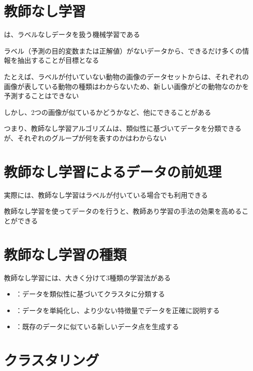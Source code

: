 \documentclass[../../../topic_machine-learning]{subfiles}
\begin{document}
\sectionline
\section{教師なし学習}

は、ラベルなしデータを扱う機械学習である

ラベル（予測の目的変数または正解値）がないデータから、できるだけ多くの情報を抽出することが目標となる

\br

たとえば、ラベルが付いていない動物の画像のデータセットからは、それぞれの画像が表している動物の種類はわからないため、新しい画像がどの動物なのかを予測することはできない

しかし、2つの画像が似ているかどうかなど、他にできることがある

\br

つまり、教師なし学習アルゴリズムは、類似性に基づいてデータを分類できるが、それぞれのグループが何を表すのかはわからない

\sectionline
\section{教師なし学習によるデータの前処理}

実際には、教師なし学習はラベルが付いている場合でも利用できる

教師なし学習を使ってデータのを行うと、教師あり学習の手法の効果を高めることができる

\sectionline
\section{教師なし学習の種類}

教師なし学習には、大きく分けて3種類の学習法がある

\begin{itemize}
  \item {}：データを類似性に基づいてクラスタに分類する
  \item {}：データを単純化し、より少ない特徴量でデータを正確に説明する
  \item {}：既存のデータに似ている新しいデータ点を生成する
\end{itemize}

\sectionline
\section{クラスタリング}
\end{document}
